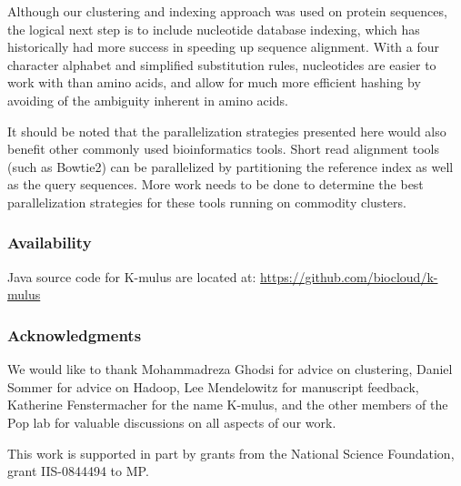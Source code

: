 Although our clustering and indexing approach was used on protein sequences, the logical next step is to include nucleotide database indexing, which has historically had more success in speeding up sequence alignment\cite{kent2002blat}.
With a four character alphabet and simplified substitution rules, nucleotides are easier to work with than amino acids, and allow for much more efficient hashing by avoiding of the ambiguity inherent in amino acids.

It should be noted that the parallelization strategies presented here would also benefit other commonly used bioinformatics tools.  Short read alignment tools (such as Bowtie2\cite{langmead2012fast}) can be parallelized by partitioning the reference index as well as the query sequences.  More work needs to be done to determine the best parallelization strategies for these tools running on commodity clusters.

\subsubsection{Availability}
Java source code for K-mulus are located at: \url{https://github.com/biocloud/k-mulus}

\subsubsection{Acknowledgments}
We would like to thank Mohammadreza Ghodsi for advice on clustering, Daniel Sommer for advice on Hadoop, Lee Mendelowitz for manuscript feedback, Katherine Fenstermacher for the name K-mulus, and the other members of the Pop lab for valuable discussions on all aspects of our work.

This work is supported in part by grants from the National Science Foundation, grant IIS-0844494 to MP.
